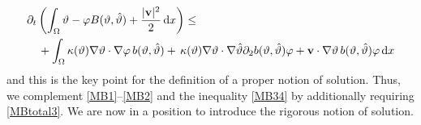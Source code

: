 \documentclass[11pt, a4paper, reqno]{amsart}
\numberwithin{equation}{section}
\newcommand{\vc}[1]{{\bf #1}}
\newcommand{\vv}{\vc{v}}
\newcommand{\thet}{\vartheta}
\newcommand{\dx}{\,{\rm d} {x}}
\newcommand{\intO}[1]{\int_{\Omega} #1 \dx}
\begin{document}
\begin{equation}\label{MBtotal3}
\begin{split}
  &\partial_t \left(\intO{\thet -\varphi  B(\thet,\hat{\thet}) + \frac{|\vv|^2}{2}}\right) \le \\
     &\quad +\intO{\kappa(\thet)\nabla \thet \cdot \nabla \varphi \, b(\thet,\hat{\thet})+\, \kappa(\thet)\nabla \thet \cdot \nabla \hat{\thet} \partial_2 b(\thet,\hat{\thet}) \varphi +\vv\cdot \nabla \thet \, b(\thet,\hat{\thet})\varphi}
\end{split}
\end{equation}
and this is the key point for the definition of a proper notion of solution. Thus, we complement \eqref{MB1}--\eqref{MB2} and the inequality \eqref{MB34} by additionally requiring \eqref{MBtotal3}.  
We are now in a position to introduce the rigorous notion of solution.
\end{document}
